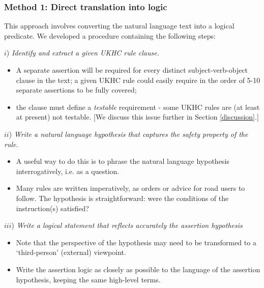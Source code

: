 \vspace{2mm}
\subsubsection{\textbf{Method 1}: Direct translation into logic}
\label{direct_translation}

This approach involves converting the natural language text into a logical predicate. We developed a procedure containing the following steps: 

\noindent $i$) \emph{Identify and extract a given UKHC rule clause.} 
    \begin{itemize}
    	\item A separate assertion will be required for every distinct subject-verb-object clause in the text; a given UKHC rule could easily require in the order of 5-10 separate assertions to be fully covered;
    	\item the clause must define a \emph{testable} requirement - some UKHC rules are (at least at present) not testable. [We discuss this issue further in Section \ref{discussion}.]
    \end{itemize} 
    \noindent $ii$) \emph{Write a natural language hypothesis that captures the safety property of the rule.} 
    \begin{itemize}
    	\item A useful way to do this is to phrase the natural language hypothesis interrogatively, i.e. as a question.
    	\item Many rules are written imperatively, as orders or advice for road users to follow. The hypothesis is straightforward: were the conditions of the instruction(s) satisfied? %
    \end{itemize}
      
    \noindent $iii$)  \emph{Write a logical statement that reflects accurately the assertion hypothesis}
    \begin{itemize}
    	\item Note that the perspective of the hypothesis may need to be transformed to a `third-person' (external) viewpoint.
    	\item Write the assertion logic as closely as possible to the language of the assertion hypothesis, keeping the same high-level terms.%
    \end{itemize}
   
